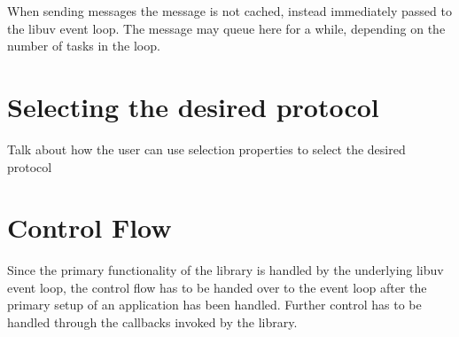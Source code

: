When sending messages the message is not cached, instead
immediately passed to the libuv event loop. The message
may queue here for a while, depending on the number of tasks
in the loop.



\section{Selecting the desired protocol}
Talk about how the user can use selection properties to select the desired protocol 

\section{Control Flow}
Since the primary functionality of the library is handled
by the underlying libuv event loop, the control flow has
to be handed over to the event loop after the primary setup
of an application has been handled. Further control has
to be
handled through the callbacks invoked by the library.
